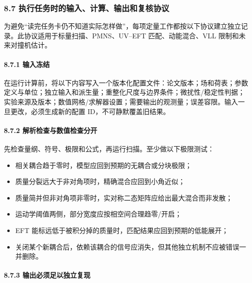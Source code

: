 \documentclass[
]{article}
\providecommand{\tightlist}{%
  \setlength{\itemsep}{0pt}\setlength{\parskip}{0pt}}
\begin{document}
\subsubsection{8.7
执行任务时的输入、计算、输出和复核协议}\label{ux6267ux884cux4efbux52a1ux65f6ux7684ux8f93ux5165ux8ba1ux7b97ux8f93ux51faux548cux590dux6838ux534fux8bae}

为避免``读完任务卡仍不知道实际怎样做''，每项定量工作都按以下协议建立独立记录。此协议适用于标量扫描、PMNS、UV--EFT
匹配、动能混合、VLL 限制和未来对撞机估计。

\paragraph{8.7.1 输入冻结}\label{ux8f93ux5165ux51bbux7ed3}

在运行计算前，将以下内容写入一个版本化配置文件：论文版本；场和荷表；参数定义与单位；独立输入和派生量；重整化尺度与边界条件；微扰性/稳定性判据；实验来源及版本；数值网格/求解器设置；需要输出的观测量；误差容限。输入一旦更改，必须生成新的配置
ID，不可静默覆盖旧结果。

\paragraph{8.7.2
解析检查与数值检查分开}\label{ux89e3ux6790ux68c0ux67e5ux4e0eux6570ux503cux68c0ux67e5ux5206ux5f00}

先检查量纲、符号、极限和公式，再运行扫描。至少做以下极限测试：

\begin{itemize}
\tightlist
\item
  相关耦合趋于零时，模型应回到预期的无耦合或分块极限；
\item
  质量分裂远大于非对角项时，精确混合应回到小角近似；
\item
  质量简并但非对角项非零时，实对称二态矩阵应给出最大混合而非发散；
\item
  运动学阈值两侧，部分宽度应按相空间合理趋零/开启；
\item
  EFT 能标远低于被积分掉的质量时，匹配结果应回到预期的低能展开；
\item
  关闭某个新耦合后，依赖该耦合的信号应消失，但其他独立机制不应被错误一并删除。
\end{itemize}

\paragraph{8.7.3
输出必须足以独立复现}\label{ux8f93ux51faux5fc5ux987bux8db3ux4ee5ux72ecux7acbux590dux73b0}
\end{document}
